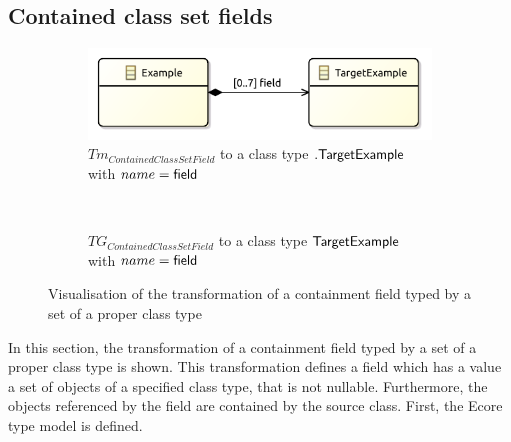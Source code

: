 \subsection{Contained class set fields}
\label{subsec:library_of_transformations:type_level_transformations:contained_class_set_fields}

\begin{figure}
    \centering
    \begin{subfigure}{0.95\textwidth}
        \centering
        \includegraphics{images/05_library_of_transformations/02_type_level_transformations/10_contained_class_set_fields/contained_class_set_field.pdf}
        \caption{$Tm_{ContainedClassSetField}$ to a class type $.\mathsf{TargetExample}$ with $name = \mathsf{field}$}
        \label{fig:library_of_transformations:type_level_transformations:contained_class_set_fields:visualisation:ecore}
    \end{subfigure}
    \\
    \begin{subfigure}{0.95\textwidth}
        \centering
        
        \caption{$TG_{ContainedClassSetField}$ to a class type $\mathsf{TargetExample}$ with $name = \mathsf{field}$}
        \label{fig:library_of_transformations:type_level_transformations:contained_class_set_fields:visualisation:groove}
    \end{subfigure}
    \caption{Visualisation of the transformation of a containment field typed by a set of a proper class type}
    \label{fig:library_of_transformations:type_level_transformations:contained_class_set_fields:visualisation}
\end{figure}

In this section, the transformation of a containment field typed by a set of a proper class type is shown. This transformation defines a field which has a value a set of objects of a specified class type, that is not nullable. Furthermore, the objects referenced by the field are contained by the source class. First, the Ecore type model is defined.

